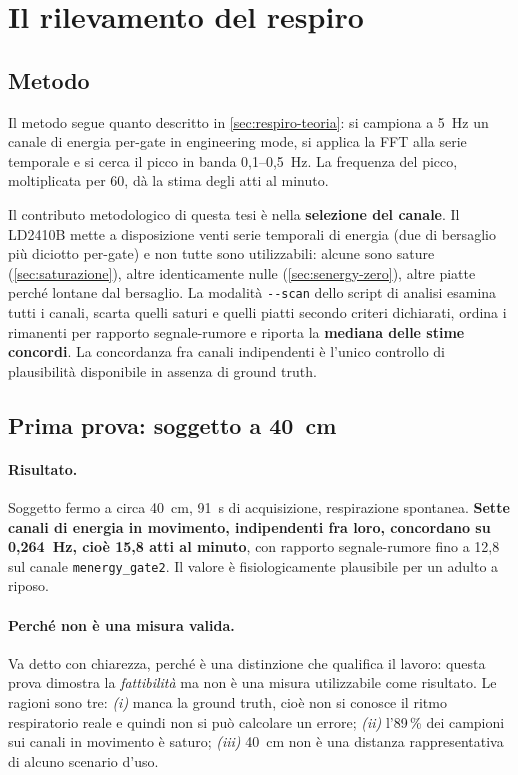 \section{Il rilevamento del respiro}
\label{sec:respiro}

\subsection{Metodo}

Il metodo segue quanto descritto in \cref{sec:respiro-teoria}: si campiona a 5~Hz
un canale di energia per-gate in engineering mode, si applica la FFT alla serie
temporale e si cerca il picco in banda 0,1--0,5~Hz. La frequenza del picco,
moltiplicata per 60, dà la stima degli atti al minuto.

Il contributo metodologico di questa tesi è nella \textbf{selezione del canale}. Il
LD2410B mette a disposizione venti serie temporali di energia (due di bersaglio più
diciotto per-gate) e non tutte sono utilizzabili: alcune sono sature
(\cref{sec:saturazione}), altre identicamente nulle (\cref{sec:senergy-zero}), altre
piatte perché lontane dal bersaglio. La modalità \texttt{-{}-scan} dello script di
analisi esamina tutti i canali, scarta quelli saturi e quelli piatti secondo criteri
dichiarati, ordina i rimanenti per rapporto segnale-rumore e riporta la
\textbf{mediana delle stime concordi}. La concordanza fra canali indipendenti è
l'unico controllo di plausibilità disponibile in assenza di ground truth.

\subsection{Prima prova: soggetto a 40~cm}

\paragraph{Risultato.} Soggetto fermo a circa 40~cm, 91~s di acquisizione,
respirazione spontanea. \textbf{Sette canali di energia in movimento, indipendenti
fra loro, concordano su 0,264~Hz, cioè 15,8 atti al minuto}, con rapporto
segnale-rumore fino a 12,8 sul canale \texttt{menergy\_gate2}. Il valore è
fisiologicamente plausibile per un adulto a riposo.

\paragraph{Perché non è una misura valida.} Va detto con chiarezza, perché è una
distinzione che qualifica il lavoro: questa prova dimostra la \emph{fattibilità} ma
non è una misura utilizzabile come risultato. Le ragioni sono tre:
\emph{(i)} manca la ground truth, cioè non si conosce il ritmo respiratorio reale e
quindi non si può calcolare un errore; \emph{(ii)} l'89\,\% dei campioni sui canali
in movimento è saturo; \emph{(iii)} 40~cm non è una distanza rappresentativa di
alcuno scenario d'uso.


